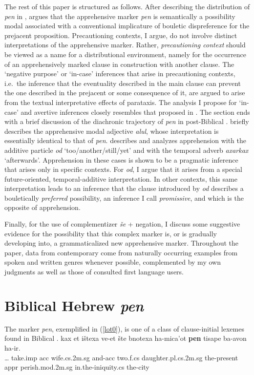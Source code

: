 \documentclass[output=paper,colorlinks,citecolor=brown]{langscibook}
\begin{document}
The rest of this paper is structured as follows. After describing the distribution of \textit{pen} in ,  argues that the apprehensive marker \textit{pen} is semantically a possibility modal associated with a conventional implicature of bouletic dispreference for the prejacent proposition. Precautioning contexts, I argue, do not involve distinct interpretations of the apprehensive marker. Rather, \textit{precautioning context} should be viewed as a name for a distributional environment, namely for the occurrence of an apprehensively marked clause in construction with another clause. The `negative purpose' or `in-case' inferences that arise in precautioning contexts, i.e.\ the inference that the eventuality described in the main clause can prevent the one described in the prejacent or some consequence of it, are argued to arise from the textual interpretative effects of parataxis. The analysis I propose for `in-case' and avertive inferences closely resembles that proposed in \citet{anderbois21}. The section ends with a brief discussion of the diachronic trajectory of \textit{pen} in post-Biblical .  briefly describes the apprehensive modal adjective \textit{alul}, whose interpretation is essentially identical to that of \textit{pen}.  describes and analyzes apprehension with the additive particle \textit{od } `too/another/still/yet' and with the temporal adverb \textit{axarkax} `afterwards'. Apprehension in these cases is shown to be a pragmatic inference that arises only in specific contexts. For \textit{od}, I argue that it arises from a special future-oriented, temporal-additive interpretation. In other contexts, this same interpretation leads to an inference that the clause introduced by \textit{od} describes a bouletically \textit{preferred} possibility, an inference I call \textit{promissive}, and which is the opposite of apprehension.

Finally, for the use of complementizer \textit{še} + negation, I discuss some suggestive evidence for the possibility that this complex marker is, or is gradually developing into, a grammaticalized new apprehensive marker. Throughout the paper, data from contemporary  come from naturally occurring examples from spoken and written genres whenever possible, complemented by my own judgments as well as those of consulted first language users.

\section{Biblical Hebrew \textit{pen}}
\largerpage
\label{sec:biblicalhebrew}
The marker \textit{pen}, exemplified in (\ref{lot0}), is one of a class of clause-initial lexemes found in Biblical . 
\ea
\label{lot0} 
\gll {\ldots} kax et ištexa ve-et šte bnotexa ha-mica'ot \textbf{pen} tisape ba-avon ha-ir. \\
{\ldots}  take.{\sc imp} {\sc acc} wife.{\sc cs}.2{\sc m.sg} and-{\sc acc} two.{\sc f.cs} daughter.{\sc pl.cs}.{\sc 2m.sg} the-present {\sc appr} perish.{\sc mod.2m.sg} in.the-iniquity.{\sc cs} the-city \\
\end{document}
